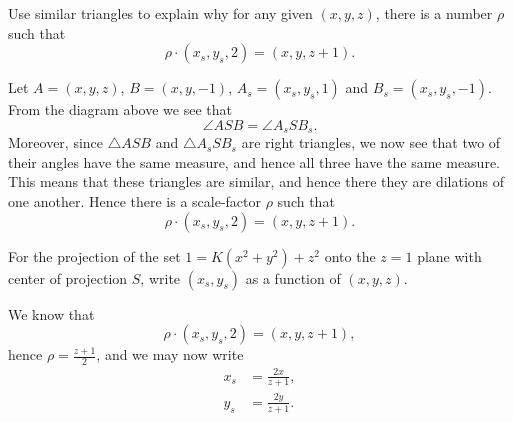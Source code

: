 \documentclass[hints,handout,12pt,noauthor,nooutcomes]{ximera}
\begin{document}
\begin{problem}
  Use similar triangles to explain why for any given $(x,y,z)$, there
  is a number $\rho$ such that
  \[
  \rho\cdot(x_s,y_s,2) = (x,y,z+1).
  \]
  \begin{freeResponse}
    Let $A = (x,y,z)$, $B= (x,y,-1)$, $A_s = (x_s,y_s,1)$ and
    $B_s=(x_s,y_s,-1)$. From the diagram above we see that
    \[
    \angle ASB = \angle A_s S B_s.
    \]
    Moreover, since $\triangle ASB$ and $\triangle A_s S B_s$ are
    right triangles, we now see that two of their angles have the same
    measure, and hence all three have the same measure. This means
    that these triangles are similar, and hence there they are
    dilations of one another. Hence there is a scale-factor $\rho$
    such that
    \[
    \rho\cdot(x_s,y_s,2) = (x,y,z+1).
    \]
  \end{freeResponse}
\end{problem}

\begin{problem}
  For the projection of the set $1=K\left(x^{2}+y^{2}\right)+z^{2}$
  onto the $z=1$ plane with center of projection $S$, write
  $(x_{s},y_{s})$ as a function of $(x,y,z)$.
  \begin{freeResponse}
    We know that
    \[
    \rho\cdot(x_{s},y_{s},2)=(x,y,z+1),
    \]
    hence $\rho=\frac{z+1}{2}$, and we may now write
    \begin{align*}
      x_{s} &=\frac{2x}{z+1},\\
      y_{s} &=\frac{2y}{z+1}.
    \end{align*}
  \end{freeResponse}
\end{problem}
\end{document}
